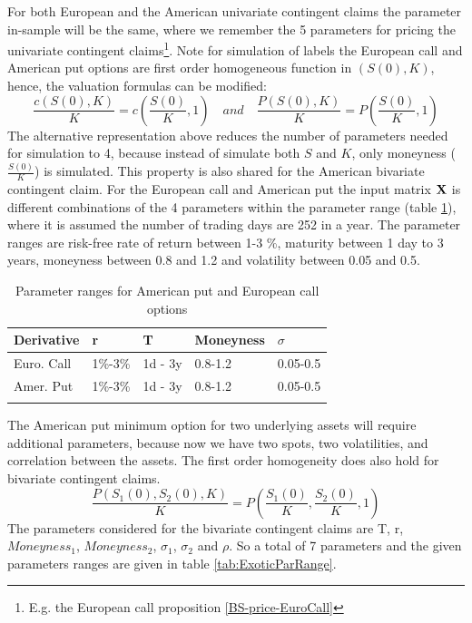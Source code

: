 For both European and the American univariate contingent claims the parameter in-sample will be the same, where we remember the 5 parameters for pricing the  univariate contingent claims\footnote{E.g. the European call proposition \ref{BS-price-EuroCall}}. Note for simulation of labels the European call and American put options are first order homogeneous function in $(S(0),K)$, hence, the valuation formulas can be modified:
$$\frac{c(S(0),K)}{K}=c(\frac{S(0)}{K},1) \quad and \quad \frac{P(S(0),K)}{K}=P(\frac{S(0)}{K},1)$$
The alternative representation above reduces the number of parameters needed for simulation to 4, because instead of simulate both $S$ and $K$, only moneyness ($\frac{S(0)}{K}$) is  simulated. This property is also shared for the American bivariate contingent claim. For the European call and American put the input matrix $\mathbf{X}$ is different combinations of the 4 parameters within the parameter range (table \ref{tab:vanillaParRange}), where it is assumed the number of trading days are 252 in a year. The parameter ranges are risk-free rate of return between 1-3 \%, maturity between 1 day to 3 years, moneyness between 0.8 and 1.2 and volatility between 0.05 and 0.5. \\

\begin{table}[th]
\caption[Parameter Ranges In-sample for MLP on Univariate Contingent Claims]{Parameter ranges for American put and European call options}
\label{tab:vanillaParRange}
\centering
\begin{tabular}{l l l l l}
\toprule
\textbf{Derivative} & \textbf{r} & \textbf{T} & \textbf{Moneyness} & $\sigma$ \\
\midrule
Euro. Call & 1\%-3\% & 1d - 3y & 0.8-1.2 & 0.05-0.5\\ 
Amer. Put & 1\%-3\% & 1d - 3y & 0.8-1.2 & 0.05-0.5\\ 
\bottomrule\\
\end{tabular}
\end{table}

The American put minimum option for two underlying assets will require additional parameters, because now we have two spots, two volatilities, and correlation between the assets. The first order homogeneity does also hold for bivariate contingent claims.
$$\frac{P(S_1(0),S_2(0),K)}{K}=P(\frac{S_1(0)}{K}, \frac{S_2(0)}{K},1)$$
The parameters considered for the bivariate contingent claims are T, r, $Moneyness_1$, $Moneyness_2$, $\sigma_1$, $\sigma_2$ and $\rho$. So a total of 7 parameters and the given parameters ranges are given in table \ref{tab:ExoticParRange}.\\
   
